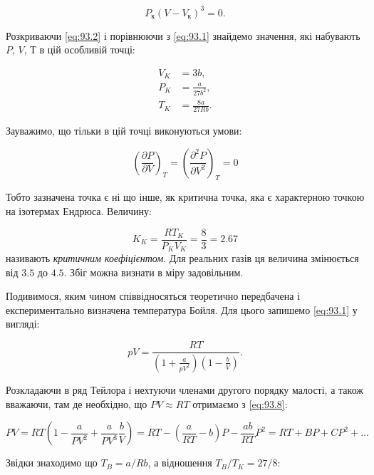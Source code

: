 \begin{equation}
P_{к}(V - V_{к})^{3} = 0.
\label{eq:93.2}
\end{equation}

Розкриваючи \eqref{eq:93.2} і порівнюючи з \eqref{eq:93.1} знайдемо значення, які набувають $P$, $V$, $Т$ в цій особливій
точці:

\begin{align}
V_{K} &= 3b, \label{eq:93.3} \\
P_{K} &= \frac{a}{27b^{2}} ,\label{eq:93.4} \\
T_{K} &= \frac{8a}{27Rb}. \label{eq:93.5}
\end{align}

Зауважимо, що тільки в цій точці виконуються умови:

\begin{equation}
\left( \frac{\partial P}{\partial V} \right)_{T} = \left( \frac{\partial^{2}P}{\partial V^{2}}
\right)_{T} = 0
\label{eq:93.6}
\end{equation}

Тобто зазначена точка є ні що інше, як критична точка, яка є характерною точкою на ізотермах Ендрюса.
Величину:

\begin{equation}
K_{K} = \frac{RT_{K}}{P_{K}V_{K}} = \frac{8}{3} = 2.67
\label{eq:93.7}
\end{equation}
називають \emph{критичним коефіцієнтом}. Для реальних газів ця величина змінюється від $3.5$ до $4.5$.
Збіг можна визнати в міру задовільним.

Подивимося, яким чином співвідносяться теоретично передбачена і експериментально визначена температура
Бойля. Для цього запишемо \eqref{eq:93.1} у вигляді:

\begin{equation}
pV = \frac{RT}{\left(1 + \frac{a}{pV^{2}}\right)\left(1 - \frac{b}{V}\right)}.
\label{eq:93.8}
\end{equation}

Розкладаючи в ряд Тейлора і нехтуючи членами другого порядку малості, а також вважаючи, там де
необхідно, що $PV \approx RT$ отримаємо з \eqref{eq:93.8}:

\begin{equation}
PV = RT\left( 1 - \frac{a}{PV^{2}} + \frac{a}{PV^{3}}\frac{b}{V} \right) = RT - \left( \frac{a}{RT} -
b \right)P - \frac{ab}{RT}P^{2} = RT + BP + CP^{2} + \ldots
\label{eq:93.9}
\end{equation}

Звідки знаходимо що $T_{B} = a / Rb$, а відношення $T_{B} / T_{K} = 27/8$:

